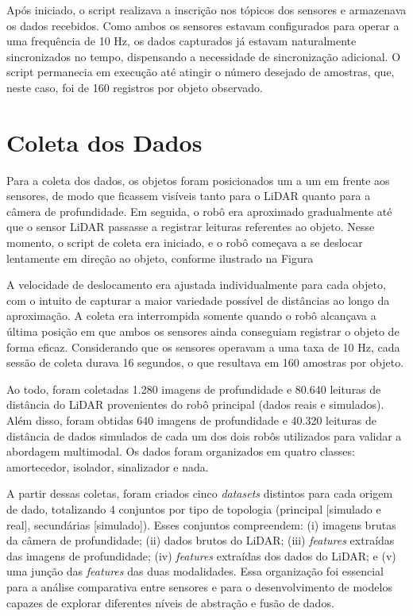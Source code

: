 Após iniciado, o script realizava a inscrição nos tópicos dos sensores e armazenava os dados recebidos. Como ambos os sensores estavam configurados para operar a uma frequência de 10 Hz, os dados capturados já estavam naturalmente sincronizados no tempo, dispensando a necessidade de sincronização adicional. O script permanecia em execução até atingir o número desejado de amostras, que, neste caso, foi de 160 registros por objeto observado.

\section{Coleta dos Dados}

Para a coleta dos dados, os objetos foram posicionados um a um em frente aos sensores, de modo que ficassem visíveis tanto para o LiDAR quanto para a câmera de profundidade. Em seguida, o robô era aproximado gradualmente até que o sensor LiDAR passasse a registrar leituras referentes ao objeto. Nesse momento, o script de coleta era iniciado, e o robô começava a se deslocar lentamente em direção ao objeto, conforme ilustrado na Figura%


A velocidade de deslocamento era ajustada individualmente para cada objeto, com o intuito de capturar a maior variedade possível de distâncias ao longo da aproximação. A coleta era interrompida somente quando o robô alcançava a última posição em que ambos os sensores ainda conseguiam registrar o objeto de forma eficaz. Considerando que os sensores operavam a uma taxa de 10 Hz, cada sessão de coleta durava 16 segundos, o que resultava em 160 amostras por objeto.

Ao todo, foram coletadas 1.280 imagens de profundidade e 80.640 leituras de distância do LiDAR provenientes do robô principal (dados reais e simulados). Além disso, foram obtidas 640 imagens de profundidade e 40.320 leituras de distância de dados simulados de cada um dos dois robôs utilizados para validar a abordagem multimodal. Os dados foram organizados em quatro classes: amortecedor, isolador, sinalizador e nada.

A partir dessas coletas, foram criados cinco \textit{datasets} distintos para cada origem de dado, totalizando 4 conjuntos por tipo de topologia (principal [simulado e real], secundárias [simulado]). Esses conjuntos compreendem: (i) imagens brutas da câmera de profundidade; (ii) dados brutos do LiDAR; (iii) \textit{features} extraídas das imagens de profundidade; (iv) \textit{features} extraídas dos dados do LiDAR; e (v) uma junção das \textit{features} das duas modalidades. Essa organização foi essencial para a análise comparativa entre sensores e para o desenvolvimento de modelos capazes de explorar diferentes níveis de abstração e fusão de dados.

